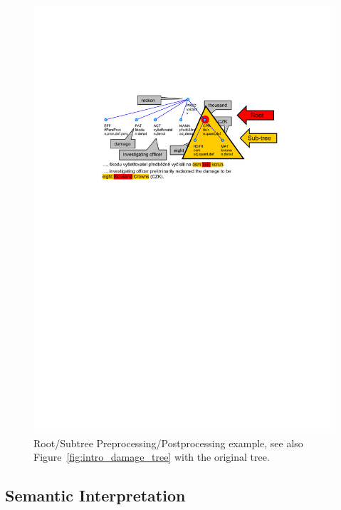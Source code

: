 \begin{figure}
	\centering
		\includegraphics[width=0.85\hsize]{tree-subtree}
	\caption{Root/Subtree Preprocessing/Postprocessing example, see also Figure~\ref{fig:intro_damage_tree} with the original tree.}
	\label{fig:tree-subtree}
\end{figure}



\subsection{Semantic Interpretation} \label{sec:SemanticInterpretation}

